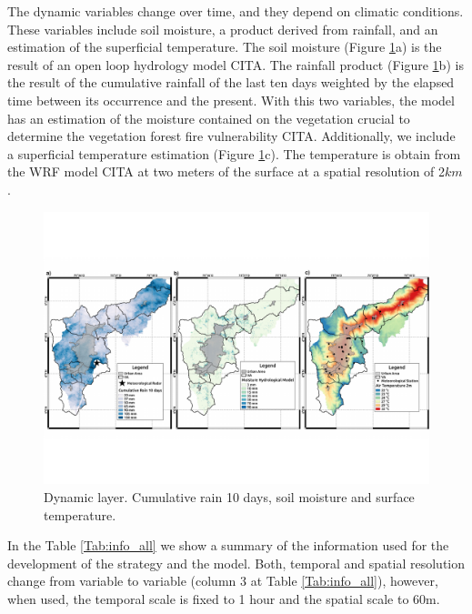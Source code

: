 The dynamic variables change over time, and they depend on climatic conditions. These variables include soil moisture, a product derived from rainfall, and an estimation of the superficial temperature. The soil moisture (Figure \ref{fig:dynamicLayers}a) is the result of an open loop hydrology model CITA. The rainfall product (Figure \ref{fig:dynamicLayers}b) is the result of the cumulative rainfall of the last ten days weighted by the elapsed time between its occurrence and the present. With this two variables, the model has an estimation of the moisture contained on the vegetation crucial to determine the vegetation forest fire vulnerability CITA. Additionally, we include a superficial temperature estimation (Figure \ref{fig:dynamicLayers}c).  The temperature is obtain from the WRF model CITA at two meters of the surface at a spatial resolution of 2$km$.\\

\begin{figure}
  \centering
  \includegraphics[width=1.0\linewidth]{Figuras/dynamic_composition1.pdf}
  \caption{Dynamic layer. Cumulative rain 10 days, soil moisture and surface temperature.}
  \label{fig:dynamicLayers}
\end{figure}

In the Table \ref{Tab:info_all} we show a summary of the information used for the development of the strategy and the model. Both, temporal and spatial resolution change from variable to variable (column 3 at Table \ref{Tab:info_all}), however, when used, the temporal scale is fixed to 1 hour and the spatial scale to 60m. 

